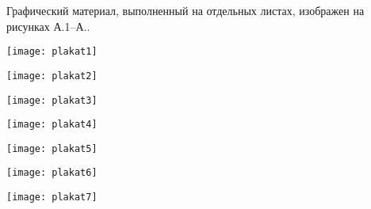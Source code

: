 
Графический материал, выполненный на отдельных листах,
изображен на рисунках А.1--А..
\setcounter{числоПлакатов}{0}

\renewcommand{\thefigure}{А.\arabic{figure}} %

\begin{landscape}

\begin{плакат}
	\texttt{[image: plakat1]}
	\label{plakat1:image}      
\end{плакат}

\begin{плакат}
	\texttt{[image: plakat2]}
	\label{plakat2:image}      
\end{плакат}

\begin{плакат}
	\texttt{[image: plakat3]}
	\label{plakat3:image}      
\end{плакат}

\begin{плакат}
	\texttt{[image: plakat4]}
	\label{plakat4:image}      
\end{плакат}

\begin{плакат}
	\texttt{[image: plakat5]}
	\label{plakat5:image}      
\end{плакат}

\begin{плакат}
	\texttt{[image: plakat6]}
	\label{plakat6:image}      
\end{плакат}

\begin{плакат}
	\texttt{[image: plakat7]}
	\label{plakat7:image}      
\end{плакат}

\end{landscape}
